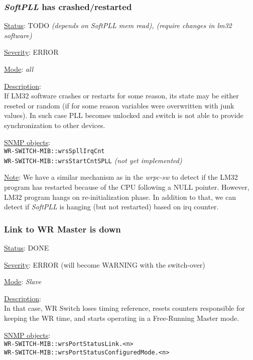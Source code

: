 \subsubsection{\bf \emph{SoftPLL} has crashed/restarted}
		\label{fail:timing:spll_crash}
		\begin{packed_enum}
			\item [] \underline{Status}: TODO \emph{(depends on SoftPLL mem read), (require changes in lm32 software)}
			\item [] \underline{Severity}: ERROR
			\item [] \underline{Mode}: \emph{all}
			\item [] \underline{Description}:\\
				If LM32 software crashes or restarts for some reason, its state may be
				either reseted or random (if for some reason variables were overwritten
				with junk values). In such case PLL becomes unlocked and switch is not
				able to provide synchronization to other devices.
			\item [] \underline{SNMP objects}:\\
				\texttt{WR-SWITCH-MIB::wrsSpllIrqCnt}\\
				\texttt{WR-SWITCH-MIB::wrsStartCntSPLL} \emph{(not yet implemented)}
			\item [] \underline{Note}: We have a similar mechanism as in the
				\emph{wrpc-sw} to detect if the LM32 program has restarted because of
				the CPU following a NULL pointer. However, LM32 program hangs on
				re-initialization phase. 
				In addition to that, we can detect if
				\emph{SoftPLL} is hanging (but not restarted) based on irq counter.
		\end{packed_enum}

\subsubsection{\bf Link to WR Master is down}
		\label{fail:timing:master_down}
		\begin{packed_enum}
			\item [] \underline{Status}: DONE
			\item [] \underline{Severity}: ERROR (will become WARNING with the
				switch-over)
			\item [] \underline{Mode}: \emph{Slave}
			\item [] \underline{Description}:\\
				In that case, WR Switch loses timing reference, resets counters
				responsible for keeping the WR time, and starts operating in a
				Free-Running Master mode.
			\item [] \underline{SNMP objects}:\\
				\texttt{WR-SWITCH-MIB::wrsPortStatusLink.<n>}\\
				\texttt{WR-SWITCH-MIB::wrsPortStatusConfiguredMode.<n>}
		\end{packed_enum}

